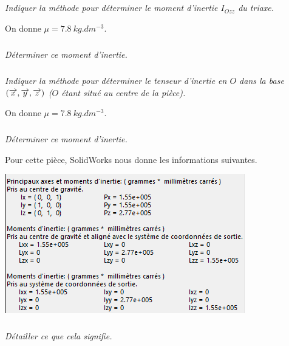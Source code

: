\documentclass[10pt,fleqn]{article} %
\begin{document}
\begin{multicols}{2}
\subparagraph{}
\textit{Indiquer la méthode pour déterminer le moment d'inertie $I_{Ozz}$ du triaxe.}
\ifprof
\begin{corrige}
\end{corrige}
\else
\fi

On donne $\mu=\SI{7,8}{kg.dm^{-3}}$.
\subparagraph{}
\textit{Déterminer ce moment d'inertie.}
\ifprof
\begin{corrige}
\end{corrige}
\else
\fi

\subparagraph{}
\textit{Indiquer la méthode pour déterminer le tenseur d'inertie en $O$ dans la base $\left(\overrightarrow{x},\overrightarrow{y},\overrightarrow{z} \right)$ ($O$ étant situé au centre de la pièce).}
\ifprof
\begin{corrige}
\end{corrige}
\else
\fi

On donne $\mu=\SI{7,8}{kg.dm^{-3}}$.
\subparagraph{}
\textit{Déterminer ce moment d'inertie.}
\ifprof
\begin{corrige}
\end{corrige}
\else
\fi
Pour cette pièce, SolidWorks nous donne les informations suivantes. 
\begin{center}
\includegraphics[width=.9\linewidth]{images/SW_04.png}
\end{center}

%
%
%
%
%
%
%
%
\subparagraph{}
\textit{Détailler ce que cela signifie.}
\ifprof
\begin{corrige}
\end{corrige}
\else







\ifprof
\else
\end{multicols}
\fi
\end{document}
